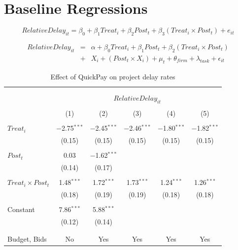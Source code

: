 \documentclass[
]{article}
\begin{document}
\hypertarget{baseline-regressions}{%
\section{Baseline Regressions}\label{baseline-regressions}}

\[ RelativeDelay_{it} = \beta_0 + \beta_1 Treat_i + \beta_2 Post_t + \beta_3 (Treat_i \times Post_t) + e_{it}\]

\[ \begin{aligned} RelativeDelay_{it} &=& \alpha+\beta_0 Treat_i + \beta_1 Post_t + \beta_2 (Treat_i \times Post_t)\\
&+&  X_i + (Post_t \times X_i) + \mu_t + \theta_{firm} + \lambda_{task}+ \epsilon_{it}
\end{aligned}\]

\begin{table}[H] \centering 
  \caption{Effect of QuickPay on project delay rates} 
  \label{} 
\small 
\begin{tabular}{@{\extracolsep{-2pt}}lccccc} 
\\[-1.8ex]\hline 
\hline \\[-1.8ex] 
\\[-1.8ex] & \multicolumn{5}{c}{$RelativeDelay_{it}$} \\ 
\\[-1.8ex] & (1) & (2) & (3) & (4) & (5)\\ 
\hline \\[-1.8ex] 
 $Treat_i$ & $-$2.75$^{***}$ & $-$2.45$^{***}$ & $-$2.46$^{***}$ & $-$1.80$^{***}$ & $-$1.82$^{***}$ \\ 
  & (0.15) & (0.15) & (0.15) & (0.15) & (0.15) \\ 
  & & & & & \\ 
 $Post_t$ & 0.03 & $-$1.62$^{***}$ &  &  &  \\ 
  & (0.14) & (0.17) &  &  &  \\ 
  & & & & & \\ 
 $Treat_i \times Post_t$ & 1.48$^{***}$ & 1.72$^{***}$ & 1.73$^{***}$ & 1.24$^{***}$ & 1.26$^{***}$ \\ 
  & (0.18) & (0.19) & (0.19) & (0.18) & (0.18) \\ 
  & & & & & \\ 
 Constant & 7.86$^{***}$ & 5.88$^{***}$ &  &  &  \\ 
  & (0.12) & (0.14) &  &  &  \\ 
  & & & & & \\ 
\hline \\[-1.8ex] 
Budget, Bids & No & Yes & Yes & Yes & Yes \\ 

\end{tabular}
\end{table}
\end{document}
